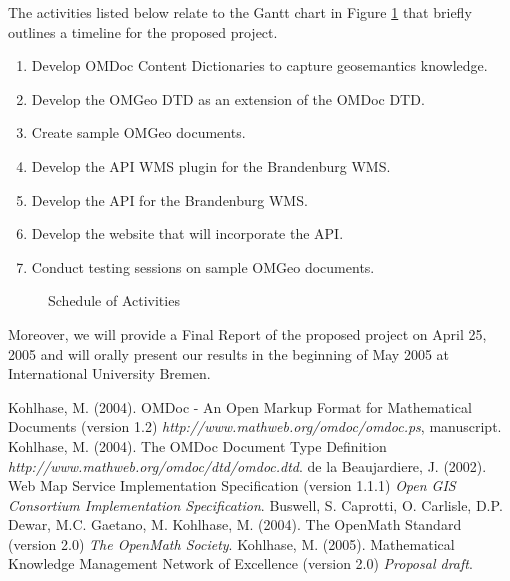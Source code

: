 \documentclass[a4paper,11pt,openany,notitlepage]{article}
\begin{document}
The activities listed below relate to the Gantt chart in Figure \ref{fig:timeline} that briefly outlines a timeline for the proposed project.
\begin{enumerate}
	\item Develop OMDoc Content Dictionaries to capture geosemantics knowledge.
	\item Develop the OMGeo DTD as an extension of the OMDoc DTD.
	\item Create sample OMGeo documents.
	\item Develop the API WMS plugin for the Brandenburg WMS.
	\item Develop the API for the Brandenburg WMS.
	\item Develop the website that will incorporate the API.
	\item Conduct testing sessions on sample OMGeo documents.
\end{enumerate}
\begin{figure}[h]
	\centering		
		\caption{Schedule of Activities}
	\label{fig:timeline}
\end{figure}

Moreover, we will provide a Final Report of the proposed project on April 25, 2005 and will orally present our results in the beginning of May 2005 at International University Bremen.
%
\newpage

\begin{thebibliography}{0}
%
Kohlhase, M. (2004). OMDoc - An Open Markup Format for Mathematical 
Documents (version 1.2) \textit{http://www.mathweb.org/omdoc/omdoc.ps}, manuscript.
%
Kohlhase, M. (2004). The OMDoc Document Type Definition \textit{http://www.mathweb.org/omdoc/dtd/omdoc.dtd}.
%
de la Beaujardiere, J. (2002). Web Map Service Implementation Specification (version 1.1.1) \textit{Open GIS Consortium Implementation Specification}.
%
Buswell, S. Caprotti, O. Carlisle, D.P. Dewar, M.C. Gaetano, M. Kohlhase, M. (2004). The OpenMath Standard (version 2.0) \textit{The OpenMath Society}.
%
Kohlhase, M. (2005). Mathematical Knowledge Management Network of Excellence (version 2.0) \textit{Proposal draft}.
%
\end{thebibliography}
\end{document}
